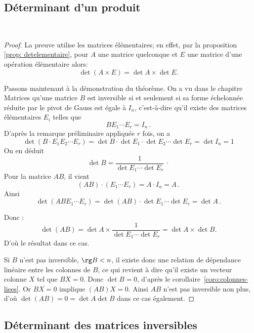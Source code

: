 \documentclass[class=report,crop=false]{standalone}
\begin{document}
\subsection{Déterminant d'un produit}


\begin{theoreme}~
\end{theoreme}

\begin{proof}
La preuve utilise les matrices élémentaires; en effet, par
la proposition \ref{prop: detelementaire}, pour $A$
une matrice quelconque et $E$ une matrice d'une opération élémentaire alors:
$$\det (A \times E) = \det A \times \det E.$$

\medskip

Passons maintenant à la démonstration du théorème. On a vu dans le chapitre \og Matrices \fg{}
qu'une matrice $B$ est inversible si et seulement si sa forme échelonnée réduite
par le pivot de Gauss est égale à $I_n$, c'est-à-dire qu'il existe des matrices élémentaires
$E_i$ telles que
\[
B E_1\cdots E_r = I_{n} \, .
\]
D'après la remarque préliminaire appliquée $r$ fois, on a
$$\det (B  \cdot E_1 E_2 \cdots E_r)
=\det B  \cdot \det E_1  \cdot \det E_2 \cdots \det E_r = \det I_n = 1$$
On en déduit
\[
\det B=\frac1{\det E_1 \cdots \det E_r}\, \cdotp
\]
Pour la matrice $AB$, il vient
\[
(AB) \cdot (E_1\cdots E_r) = A \cdot I_n =A \, .
\]
Ainsi
\[
\det(A B E_1 \cdots E_r) = \det(A B) \cdot \det E_1  \cdots \det E_r = \det A \, .
\]

Donc :
$$\det(AB) = \det A \times \frac1{\det E_1 \cdots \det E_r} = \det A \times \det B.$$
D'où le résultat dans ce cas.

\medskip

Si $B$ n'est pas inversible, $\rg B<n$, il existe donc une relation de dépendance linéaire
entre les colonnes de $B$, ce qui revient à dire qu'il existe un vecteur colonne $X$
tel que $BX=0$. Donc  $\det B=0$, d'après le corollaire~\ref{coro:colonnes-liees}.
Or $BX=0$ implique $(AB)X=0$. Ainsi $AB$ n'est pas inversible non plus, d'où
$\det (AB)=0=\det A\det B$ dans ce cas également.

\end{proof}


\subsection{Déterminant des matrices inversibles}
\end{document}
